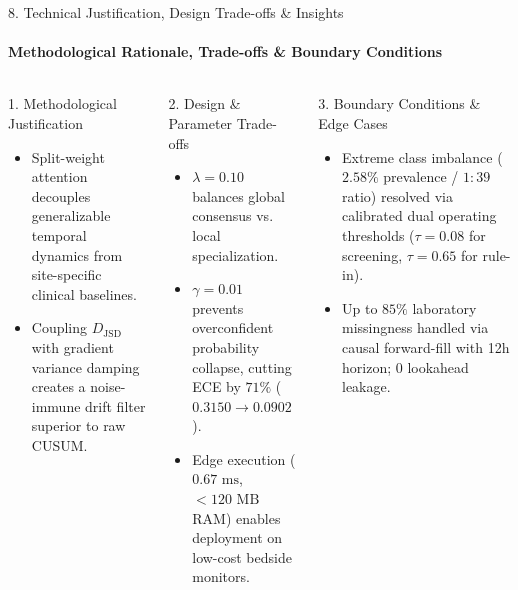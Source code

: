 \documentclass[aspectratio=169, 11pt]{beamer}
\begin{document}
\begin{frame}{8. Technical Justification, Design Trade-offs \& Insights}
    \framesubtitle{Methodological Rationale, Trade-offs \& Boundary Conditions}
    \begin{columns}[T]
        \begin{block}{1. Methodological Justification}
            \scriptsize
            \begin{itemize}
                \item Split-weight attention decouples generalizable temporal dynamics from site-specific clinical baselines.
                \item Coupling $D_{\text{JSD}}$ with gradient variance damping creates a noise-immune drift filter superior to raw CUSUM.
            \end{itemize}
        \end{block}

        \begin{block}{2. Design \& Parameter Trade-offs}
            \scriptsize
            \begin{itemize}
                \item $\lambda = 0.10$ balances global consensus vs. local specialization.
                \item $\gamma = 0.01$ prevents overconfident probability collapse, cutting ECE by $71\%$ ($0.3150 \rightarrow 0.0902$).
                \item Edge execution ($0.67\text{ ms}$, $<120\text{ MB}$ RAM) enables deployment on low-cost bedside monitors.
            \end{itemize}
        \end{block}

        \begin{block}{3. Boundary Conditions \& Edge Cases}
            \scriptsize
            \begin{itemize}
                \item Extreme class imbalance ($2.58\%$ prevalence / $1:39$ ratio) resolved via calibrated dual operating thresholds ($\tau = 0.08$ for screening, $\tau = 0.65$ for rule-in).
                \item Up to $85\%$ laboratory missingness handled via causal forward-fill with 12h horizon; 0 lookahead leakage.
            \end{itemize}
        \end{block}


\end{columns}
\end{frame}
\end{document}
